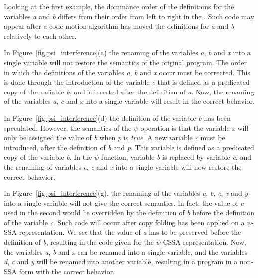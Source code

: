 Looking at the first example, the dominance order of the definitions
for the variables \textit{a} and \textit{b} differs from their order from
left to right in the \psifun. Such code may appear after a
code motion algorithm has moved the definitions for \textit{a} and
\textit{b} relatively to each other.


In Figure~\ref{fig:psi_interference}(a) the renaming of the variables
\textit{a}, \textit{b} and \textit{x} into a single variable will not restore
the semantics of the original program. The order in which the
definitions of the variables \textit{a}, \textit{b} and \textit{x} occur must
be corrected. This is done through the introduction of the variable
\textit{c} that is defined as a predicated copy of the variable \textit{b},
and is inserted after the definition of \textit{a}. Now, the renaming of
the variables \textit{a}, \textit{c} and \textit{x} into a single variable will
result in the correct behavior.

In Figure~\ref{fig:psi_interference}(d) the definition of the variable
\textit{b} has been speculated. However, the semantics of the $\psi$
operation is that the variable \textit{x} will only be assigned the value
of \textit{b} when \textit{p} is \textit{true}. A new variable \textit{c} must be
introduced, after the definition of \textit{b} and \textit{p}. This variable
is defined as a predicated copy of the variable \textit{b}. In the
${\psi}$ function, variable \textit{b} is replaced by variable \textit{c},
and the renaming of variables \textit{a}, \textit{c} and \textit{x} into a
single variable will now restore the correct behavior.

In Figure~\ref{fig:psi_interference}(g), the renaming of the variables
\textit{a}, \textit{b}, \textit{c}, \textit{x} and \textit{y} into a single variable
will not give the correct semantics. In fact, the value of \textit{a}
used in the second \psifun would be overridden by the
definition of \textit{b} before the definition of the variable
\textit{c}. Such code will occur after copy folding has been applied on a
$\psi$-SSA representation. We see that the value of \textit{a} has to be
preserved before the definition of \textit{b}, resulting in the code
given for the $\psi$-CSSA representation. Now, the variables \textit{a},
\textit{b} and \textit{x} can be renamed into a single variable, and the
variables \textit{d}, \textit{c} and \textit{y} will be renamed into another
variable, resulting in a program in a non-SSA form with the correct
behavior.

